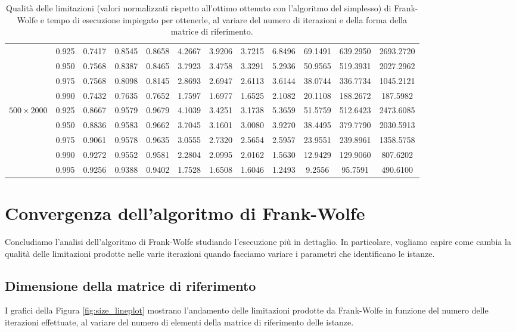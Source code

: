 \begin{landscape}
\begin{table}[!h]
\begin{tabularx}{659.32144pt}{cccccccccccc}
        & 0.925 & 0.7417 & 0.8545 & 0.8658 & 4.2667 & 3.9206 & 3.7215 & 6.8496 & 69.1491 & 639.2950 & 2693.2720 \\
        & 0.950 & 0.7568 & 0.8387 & 0.8465 & 3.7923 & 3.4758 & 3.3291 & 5.2936 & 50.9565 & 519.3931 & 2027.2962 \\
        & 0.975 & 0.7568 & 0.8098 & 0.8145 & 2.8693 & 2.6947 & 2.6113 & 3.6144 & 38.0744 & 336.7734 & 1045.2121 \\
        & 0.990 & 0.7432 & 0.7635 & 0.7652 & 1.7597 & 1.6977 & 1.6525 & 2.1082 & 20.1108 & 188.2672 & 187.5982 \\
        \midrule
        \( 500\times 2000 \)
        & 0.925 & 0.8667 & 0.9579 & 0.9679 & 4.1039 & 3.4251 & 3.1738 & 5.3659 & 51.5759 & 512.6423 & 2473.6085 \\
        & 0.950 & 0.8836 & 0.9583 & 0.9662 & 3.7045 & 3.1601 & 3.0080 & 3.9270 & 38.4495 & 379.7790 & 2030.5913 \\
        & 0.975 & 0.9061 & 0.9578 & 0.9635 & 3.0555 & 2.7320 & 2.5654 & 2.5957 & 23.9551 & 239.8961 & 1358.5758 \\
        & 0.990 & 0.9272 & 0.9552 & 0.9581 & 2.2804 & 2.0995 & 2.0162 & 1.5630 & 12.9429 & 129.9060 & 807.6202 \\
        & 0.995 & 0.9256 & 0.9388 & 0.9402 & 1.7528 & 1.6508 & 1.6046 & 1.2493 & 9.2556 & 95.7591 & 490.6100 \\
        \bottomrule
    \end{tabularx}
    \caption{Qualità delle limitazioni (valori normalizzati rispetto all'ottimo ottenuto con l'algoritmo del simplesso)
    di Frank-Wolfe e tempo di esecuzione impiegato per ottenerle, al variare del numero di iterazioni e della forma
    della matrice di riferimento.}
    \label{table:hugetable4}
\end{table}
\end{landscape}

\section{Convergenza dell'algoritmo di Frank-Wolfe}
Concludiamo l'analisi dell'algoritmo di Frank-Wolfe studiando l'esecuzione più in dettaglio. In particolare, vogliamo
capire come cambia la qualità delle limitazioni prodotte nelle varie iterazioni quando facciamo variare i parametri che
identificano le istanze.

\subsection{Dimensione della matrice di riferimento}
I grafici della Figura \ref{fig:size_lineplot} mostrano l'andamento delle limitazioni prodotte da Frank-Wolfe in
funzione del numero delle iterazioni effettuate, al variare del numero di elementi della matrice di riferimento delle
istanze.

